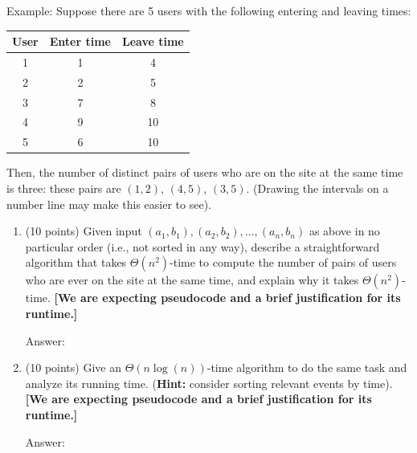 \documentclass[12pt]{article}
\begin{document}
\begin{enumerate}
  Example: Suppose there are 5 users with the following entering and leaving times:
  \begin{center}
    \begin{tabular}{c|c|c}
      User & Enter time & Leave time \\
      \hline
      1 & 1 & 4 \\
      2 & 2 & 5 \\
      3 & 7 & 8 \\
      4 & 9 & 10 \\
      5 & 6 & 10
    \end{tabular}
  \end{center}
  Then, the number of distinct pairs of users who are on the site at the same time is three: these pairs are $(1, 2)$, $(4,5)$, $(3,5)$. (Drawing the intervals on a number line may make this easier to see).

  \begin{enumerate}
    
    \item (10 points) Given input $(a_1, b_1), (a_2, b_2), \ldots, (a_n, b_n)$ as above in no particular order (i.e., not sorted in any way), describe a straightforward algorithm that takes $\Theta(n^2)$-time to compute the number of pairs of users who are ever on the site at the same time, and explain why it takes $\Theta(n^2)$-time.
    \textbf{[We are expecting pseudocode and a brief justification for its runtime.]}
    
    {\color{blue}Answer: }
        
    \item (10 points) Give an $\Theta(n \log(n))$-time algorithm to do the same task and analyze its running time. (\textbf{Hint:} consider sorting relevant events by time).
    \textbf{[We are expecting pseudocode and a brief justification for its runtime.]}
    
    {\color{blue}Answer: }
    
  \end{enumerate}


\end{enumerate}
\end{document}
